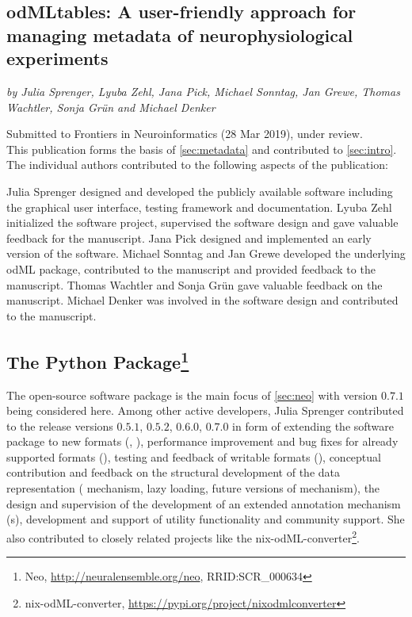 \clearpage
\subsection*{odMLtables: A user-friendly approach for managing metadata of neurophysiological experiments}
\textit{by Julia Sprenger, Lyuba Zehl, Jana Pick, Michael Sonntag, Jan Grewe, Thomas Wachtler, Sonja Grün and Michael Denker}

Submitted to Frontiers in Neuroinformatics (28 Mar 2019), under review.\\

This publication forms the basis of \cref{sec:metadata} and contributed to \cref{sec:intro}. The individual authors contributed to the following aspects of the publication:

Julia Sprenger designed and developed the publicly available software including the graphical user interface, testing framework and documentation. Lyuba Zehl initialized the software project, supervised the software design and gave valuable feedback for the manuscript. Jana Pick designed and implemented an early version of the software. Michael Sonntag and Jan Grewe developed the underlying odML package, contributed to the manuscript and provided feedback to the manuscript. Thomas Wachtler and Sonja Grün gave valuable feedback on the manuscript. Michael Denker was involved in the software design and contributed to the manuscript.\\

\vspace{2cm}
\subsection*{The  Python Package\footnote{Neo, \url{http://neuralensemble.org/neo}, RRID:SCR\_000634}}
The open-source software package  \citep{Garcia_2014} is the main focus of \cref{sec:neo}  with version $0.7.1$ being considered here. Among other active  developers, Julia Sprenger contributed to the release versions $0.5.1$, $0.5.2$, $0.6.0$, $0.7.0$ in form of extending the software package to new formats (, ), performance improvement and bug fixes for already supported formats (), testing and feedback of writable formats (), conceptual contribution and feedback on the structural development of the data representation ( mechanism, lazy loading, future versions of  mechanism), the design and supervision of the development of an extended annotation mechanism (s), development and support of utility functionality and community support. She also contributed to closely related projects like the nix-odML-converter\footnote{nix-odML-converter, \url{https://pypi.org/project/nixodmlconverter}}.

